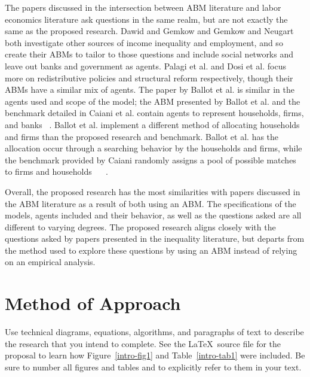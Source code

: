 \documentclass[11pt]{article}
\begin{document}
The papers discussed in the intersection between ABM literature and labor economics
 literature ask questions in the same realm, but are not exactly the same as the
 proposed research. Dawid and Gemkow and Gemkow and Neugart both investigate other
  sources of income inequality and employment, and so create their ABMs to tailor
  to those questions and include social networks and leave out banks and government
   as agents.  Palagi et al. and Dosi et al. focus more on redistributive policies
    and structural reform respectively, though their ABMs have a similar mix of agents.
The paper by Ballot et al. is similar in the agents used and scope of the model;
the ABM presented by Ballot et al. and the benchmark detailed in Caiani et al.
contain agents to represent households, firms, and banks ~\cite{Caiani-benchmark-paper}.
Ballot et al. implement a different method of allocating households and firms
than the proposed research and benchmark. Ballot et al. has the allocation
occur through a searching behavior by the households and firms, while the benchmark
provided by Caiani randomly assigns a pool of possible matches to firms and
households ~\cite{Ballot-french-paper} ~\cite{Caiani-benchmark-paper}.

Overall, the proposed research has the most similarities with papers discussed
in the ABM literature as a result of both using an ABM. The specifications of
 the models, agents included and their behavior, as well as the questions asked
  are all different to varying degrees. The proposed research aligns closely
  with the questions asked by papers presented in the inequality literature,
  but departs from the method used to explore these questions by using an ABM
  instead of relying on an empirical analysis.

\section{Method of Approach}
\label{sec:method}


Use technical diagrams, equations, algorithms, and paragraphs of text to
describe the research that you intend to complete. See the \LaTeX\ source file
for the proposal to learn how Figure~\ref{intro-fig1} and Table~\ref{intro-tab1}
were included. Be sure to number all figures and tables and to explicitly refer
to them in your text.
\end{document}
